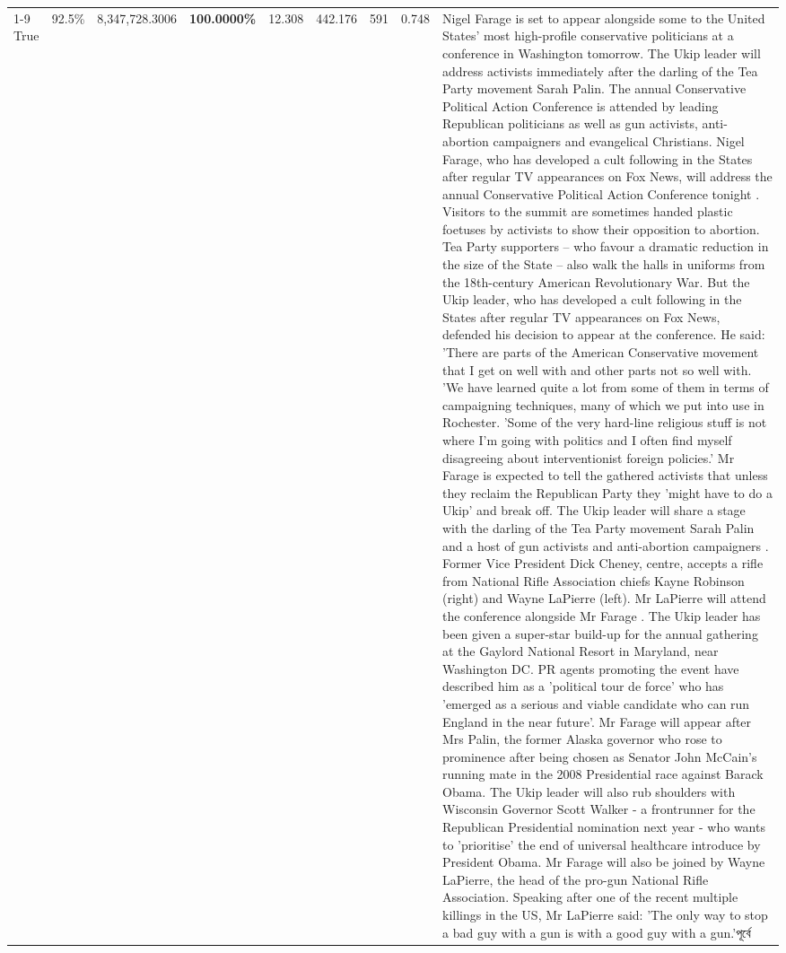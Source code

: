 \begin{table}[H]
\begin{tabular}{lllrlllll}
\cline{1-9}
True & 92.5\% & 8,347,728.3006 & \bfseries \color{red} 100.0000\% & 12.308 & 442.176 & 591 & 0.748 & Nigel Farage is set to appear alongside some to the United States' most high-profile conservative politicians at a conference in Washington tomorrow. The Ukip leader will address activists immediately after the darling of the Tea Party movement Sarah Palin. The annual Conservative Political Action Conference is attended by leading Republican politicians as well as gun activists, anti-abortion campaigners and evangelical Christians. Nigel Farage, who has developed a cult following in the States after regular TV appearances on Fox News, will address the annual Conservative Political Action Conference tonight . Visitors to the summit are sometimes handed plastic foetuses by activists to show their opposition to abortion. Tea Party supporters – who favour a dramatic reduction in the size of the State – also walk the halls in uniforms from the 18th-century American Revolutionary War. But the Ukip leader, who has developed a cult following in the States after regular TV appearances on Fox News, defended his decision to appear at the conference. He said: 'There are parts of the American Conservative movement that I get on well with and other parts not so well with. 'We have learned quite a lot from some of them in terms of campaigning techniques, many of which we put into use in Rochester. 'Some of the very hard-line religious stuff is not where I'm going with politics and I often find myself disagreeing about interventionist foreign policies.' Mr Farage is expected to tell the gathered activists that unless they reclaim the Republican Party they 'might have to do a Ukip' and break off. The Ukip leader will share a stage with the darling of the Tea Party movement Sarah Palin and a host of gun activists and anti-abortion campaigners . Former Vice President Dick Cheney, centre, accepts a rifle from National Rifle Association chiefs Kayne Robinson (right) and Wayne LaPierre (left). Mr LaPierre will attend the conference alongside Mr Farage . The Ukip leader has been given a super-star build-up for the annual gathering at the Gaylord National Resort in Maryland, near Washington DC. PR agents promoting the event have described him as a 'political tour de force' who has 'emerged as a serious and viable candidate who can run England in the near future'. Mr Farage will appear after Mrs Palin, the former Alaska governor who rose to prominence after being chosen as Senator John McCain's running mate in the 2008 Presidential race against Barack Obama. The Ukip leader will also rub shoulders with Wisconsin Governor Scott Walker - a frontrunner for the Republican Presidential nomination next year - who wants to 'prioritise' the end of universal healthcare introduce by President Obama. Mr Farage will also be joined by Wayne LaPierre, the head of the pro-gun National Rifle Association. Speaking after one of the recent multiple killings in the US, Mr LaPierre said: 'The only way to stop a bad guy with a gun is with a good guy with a gun.'পূর্বে \\

\end{tabular}
\end{table}
